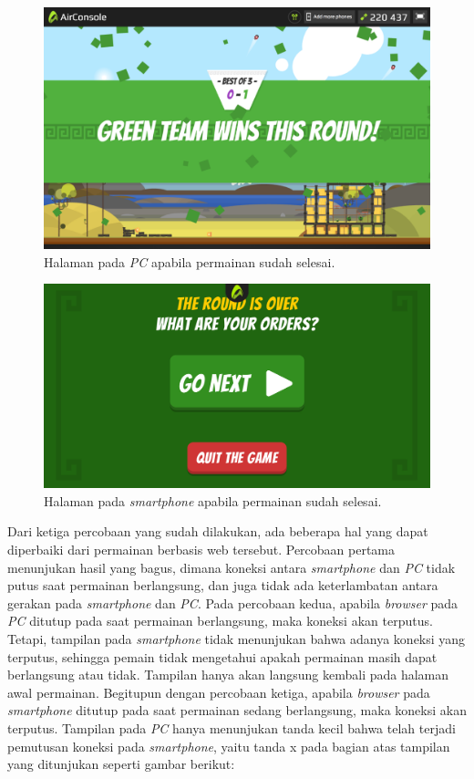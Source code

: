 \begin{figure}[H]
	\centering
	\includegraphics[scale=0.2]{Gambar/con8_play6}
	\caption{Halaman pada \textit{PC} apabila permainan sudah selesai.}
	\label{fig:27_con8_play6}
\end{figure}

\begin{figure}[H]
	\centering
	\includegraphics[scale=0.2]{Gambar/air8_finish}
	\caption{Halaman pada \textit{smartphone} apabila permainan sudah selesai.}
	\label{fig:28_air8_finish}
\end{figure}

Dari ketiga percobaan yang sudah dilakukan, ada beberapa hal yang dapat diperbaiki dari permainan berbasis web tersebut. Percobaan pertama menunjukan hasil yang bagus, dimana koneksi antara \textit{smartphone} dan \textit{PC} tidak putus saat permainan berlangsung, dan juga tidak ada keterlambatan antara gerakan pada \textit{smartphone} dan \textit{PC}. Pada percobaan kedua, apabila \textit{browser} pada \textit{PC} ditutup pada saat permainan berlangsung, maka koneksi akan terputus. Tetapi, tampilan pada \textit{smartphone} tidak menunjukan bahwa adanya koneksi yang terputus, sehingga pemain tidak mengetahui apakah permainan masih dapat berlangsung atau tidak. Tampilan hanya akan langsung kembali pada halaman awal permainan. Begitupun dengan percobaan ketiga, apabila \textit{browser} pada \textit{smartphone} ditutup pada saat permainan sedang berlangsung, maka koneksi akan terputus. Tampilan pada \textit{PC} hanya menunjukan tanda kecil bahwa telah terjadi pemutusan koneksi pada \textit{smartphone}, yaitu tanda x pada bagian atas tampilan yang ditunjukan seperti gambar berikut:

